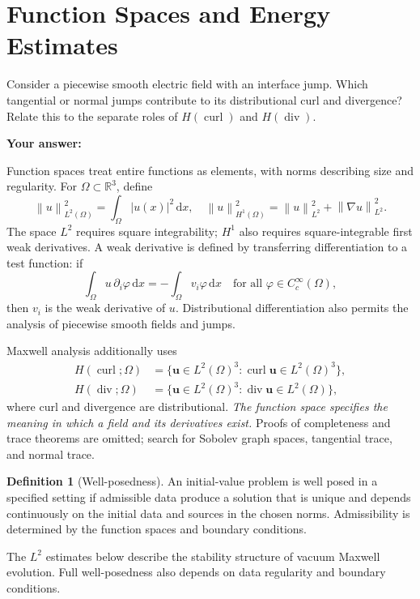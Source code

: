 \documentclass[11pt,openany]{book}
\numberwithin{equation}{chapter}
\theoremstyle{definition}
\newtheorem{definition}[theorem]{Definition}
\theoremstyle{remark}
\newcommand{\dd}{\mathrm d}
\newcommand{\RR}{\mathbb R}
\newcommand{\Div}{\operatorname{div}}
\newcommand{\curl}{\operatorname{curl}}
\newcommand{\norm}[1]{\left\lVert #1\right\rVert}
\begin{document}
\section{Function Spaces and Energy Estimates}
\begin{studentinput}
Consider a piecewise smooth electric field with an interface jump. Which tangential or normal jumps contribute to its distributional curl and divergence? Relate this to the separate roles of $H(\curl)$ and $H(\Div)$.

\textbf{Your answer:}\vspace{2cm}
\end{studentinput}
Function spaces treat entire functions as elements, with norms describing size and regularity. For $\Omega\subset\RR^3$, define
\begin{equation}
\norm{u}_{L^2(\Omega)}^2=\int_\Omega |u(x)|^2\,\dd x,
\quad
\norm{u}_{H^1(\Omega)}^2=\norm{u}_{L^2}^2+\norm{\nabla u}_{L^2}^2.
\end{equation}
The space $L^2$ requires square integrability; $H^1$ also requires square-integrable first weak derivatives. A weak derivative is defined by transferring differentiation to a test function: if
\begin{equation}
\int_\Omega u\,\partial_i\varphi\,\dd x=-\int_\Omega v_i\varphi\,\dd x
\quad\text{for all }\varphi\in C_c^\infty(\Omega),
\end{equation}
then $v_i$ is the weak derivative of $u$. Distributional differentiation also permits the analysis of piecewise smooth fields and jumps.

Maxwell analysis additionally uses
\begin{align}
H(\curl;\Omega)&=\{\bm u\in L^2(\Omega)^3:\curl\bm u\in L^2(\Omega)^3\},\\
H(\Div;\Omega)&=\{\bm u\in L^2(\Omega)^3:\Div\bm u\in L^2(\Omega)\},
\end{align}
where curl and divergence are distributional. \emph{The function space specifies the meaning in which a field and its derivatives exist.} Proofs of completeness and trace theorems are omitted; search for Sobolev graph spaces, tangential trace, and normal trace.

\begin{definition}[Well-posedness]
An initial-value problem is well posed in a specified setting if admissible data produce a solution that is unique and depends continuously on the initial data and sources in the chosen norms. Admissibility is determined by the function spaces and boundary conditions.
\end{definition}
The $L^2$ estimates below describe the stability structure of vacuum Maxwell evolution. Full well-posedness also depends on data regularity and boundary conditions.
\end{document}
